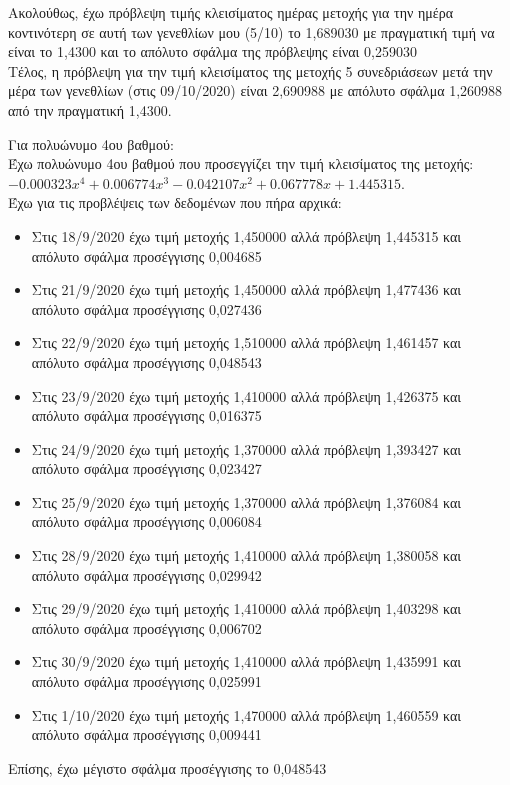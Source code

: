 \documentclass[a4paper,11pt]{article}
\newcommand{\lt}{\latintext}
\begin{document}
Ακολούθως, έχω πρόβλεψη τιμής κλεισίματος ημέρας μετοχής για την ημέρα κοντινότερη σε αυτή των γενεθλίων μου (5/10) το 1,689030 με πραγματική τιμή να είναι το 1,4300 και το απόλυτο σφάλμα της πρόβλεψης είναι 0,259030\\

Τέλος, η πρόβλεψη για την τιμή κλεισίματος της μετοχής 5 συνεδριάσεων μετά την μέρα των γενεθλίων (στις 09/10/2020) είναι 2,690988 με απόλυτο σφάλμα 1,260988 από την πραγματική 1,4300.\\

\par 
Για πολυώνυμο 4ου βαθμού:\\

Έχω πολυώνυμο 4ου βαθμού που προσεγγίζει την τιμή κλεισίματος της μετοχής: {\lt $-0.000323x^4 + 0.006774x^3 -0.042107x^2 + 0.067778x + 1.445315$}.\\


Έχω για τις προβλέψεις των δεδομένων που πήρα αρχικά:
\begin{itemize}
	\item Στις 18/9/2020 έχω τιμή μετοχής 1,450000 αλλά πρόβλεψη 1,445315 και απόλυτο σφάλμα προσέγγισης 0,004685
	\item Στις 21/9/2020 έχω τιμή μετοχής 1,450000 αλλά πρόβλεψη 1,477436 και απόλυτο σφάλμα προσέγγισης 0,027436
	\item Στις 22/9/2020 έχω τιμή μετοχής 1,510000 αλλά πρόβλεψη 1,461457 και απόλυτο σφάλμα προσέγγισης 0,048543
	\item Στις 23/9/2020 έχω τιμή μετοχής 1,410000 αλλά πρόβλεψη 1,426375 και απόλυτο σφάλμα προσέγγισης 0,016375
	\item Στις 24/9/2020 έχω τιμή μετοχής 1,370000 αλλά πρόβλεψη 1,393427 και απόλυτο σφάλμα προσέγγισης 0,023427
	\item Στις 25/9/2020 έχω τιμή μετοχής 1,370000 αλλά πρόβλεψη 1,376084 και απόλυτο σφάλμα προσέγγισης 0,006084
	\item Στις 28/9/2020 έχω τιμή μετοχής 1,410000 αλλά πρόβλεψη 1,380058 και απόλυτο σφάλμα προσέγγισης 0,029942
	\item Στις 29/9/2020 έχω τιμή μετοχής 1,410000 αλλά πρόβλεψη 1,403298 και απόλυτο σφάλμα προσέγγισης 0,006702
	\item Στις 30/9/2020 έχω τιμή μετοχής 1,410000 αλλά πρόβλεψη 1,435991 και απόλυτο σφάλμα προσέγγισης 0,025991
	\item Στις 1/10/2020 έχω τιμή μετοχής 1,470000 αλλά πρόβλεψη 1,460559 και απόλυτο σφάλμα προσέγγισης 0,009441
	\end{itemize}
Επίσης, έχω μέγιστο σφάλμα προσέγγισης το 0,048543\\
\end{document}
